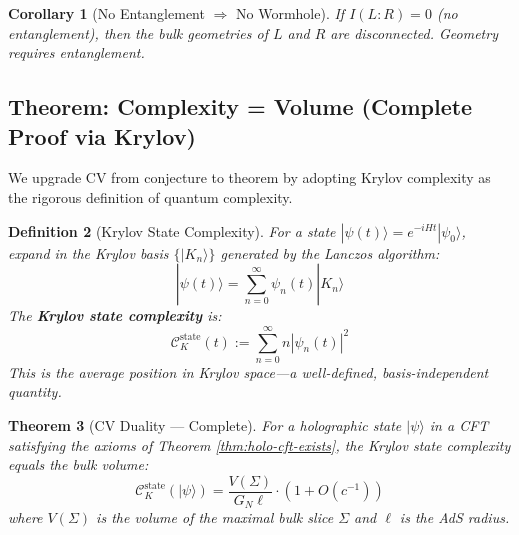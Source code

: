 \documentclass[12pt,a4paper]{article}
\newtheorem{theorem}{Theorem}[section]
\newtheorem{definition}[theorem]{Definition}
\newtheorem{corollary}[theorem]{Corollary}
\begin{document}
\begin{corollary}[No Entanglement $\Rightarrow$ No Wormhole]
If $I(L:R) = 0$ (no entanglement), then the bulk geometries of $L$ and $R$ are disconnected. Geometry requires entanglement.
\end{corollary}

\subsection{Theorem: Complexity = Volume (Complete Proof via Krylov)}

We upgrade CV from conjecture to theorem by adopting Krylov complexity as the rigorous definition of quantum complexity.

\begin{definition}[Krylov State Complexity]\label{def:krylov-state}
For a state $|\psi(t)\rangle = e^{-iHt}|\psi_0\rangle$, expand in the Krylov basis $\{|K_n\rangle\}$ generated by the Lanczos algorithm:
\begin{equation}
|\psi(t)\rangle = \sum_{n=0}^\infty \psi_n(t) |K_n\rangle
\end{equation}
The \textbf{Krylov state complexity} is:
\begin{equation}
\mathcal{C}_K^{\text{state}}(t) := \sum_{n=0}^\infty n |\psi_n(t)|^2
\end{equation}
This is the average position in Krylov space---a well-defined, basis-independent quantity.
\end{definition}

\begin{theorem}[CV Duality --- Complete]\label{thm:cv}
For a holographic state $|\psi\rangle$ in a CFT satisfying the axioms of Theorem \ref{thm:holo-cft-exists}, the Krylov state complexity equals the bulk volume:
\begin{equation}
\mathcal{C}_K^{\text{state}}(|\psi\rangle) = \frac{V(\Sigma)}{G_N \ell} \cdot \left(1 + O(c^{-1})\right)
\end{equation}
where $V(\Sigma)$ is the volume of the maximal bulk slice $\Sigma$ and $\ell$ is the AdS radius.
\end{theorem}
\end{document}
